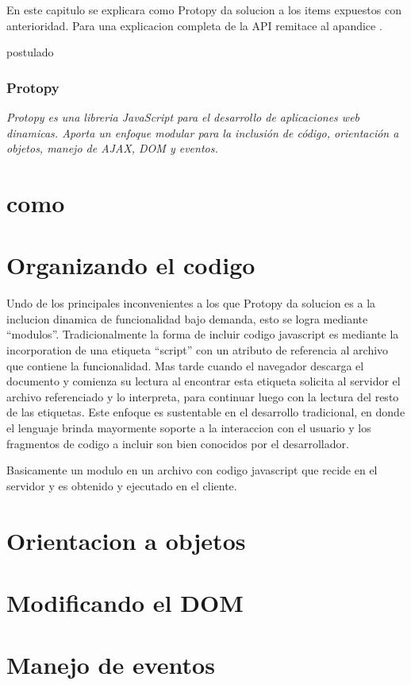 En este capitulo se explicara como Protopy da solucion a los items expuestos con
anterioridad. Para una explicacion completa de la API remitace al apandice
.

postulado
\subsubsection*{Protopy}
\textit{Protopy es una libreria JavaScript para el desarrollo de aplicaciones
web dinamicas. Aporta un enfoque modular para la inclusión de código,
orientación a objetos, manejo de AJAX, DOM y eventos.}

\section{como}

\section{Organizando el codigo}
Undo de los principales inconvenientes a los que Protopy da solucion es a la
inclucion dinamica de funcionalidad bajo demanda, esto se logra mediante
``modulos''.
Tradicionalmente la forma de incluir codigo javascript es mediante la
incorporation de una etiqueta ``script'' con un atributo de referencia
al archivo que contiene la funcionalidad. Mas tarde cuando el navegador descarga
el documento y comienza su lectura al encontrar esta etiqueta solicita
al servidor el archivo referenciado y lo interpreta, para continuar luego con la
lectura del resto de las etiquetas.
Este enfoque es sustentable en el desarrollo tradicional, en donde el lenguaje
brinda mayormente soporte a la interaccion con el usuario y los fragmentos de
codigo a incluir son bien conocidos por el desarrollador.

Basicamente un modulo en un archivo con codigo javascript que recide en el
servidor y es obtenido y ejecutado en el cliente.

\section{Orientacion a objetos}

\section{Modificando el DOM}

\section{Manejo de eventos}
